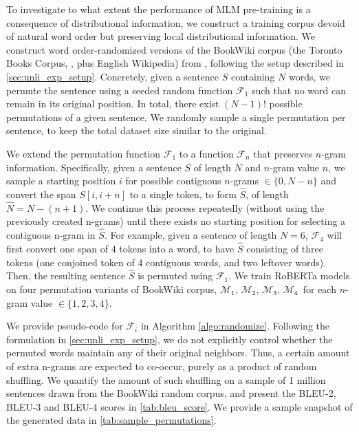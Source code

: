\documentclass[letterpaper, 12pt]{report}
\newcommand{\RI}{$\mathcal{M}_{\texttt{1}}$}
\newcommand{\RII}{$\mathcal{M}_{\texttt{2}}$}
\newcommand{\RIII}{$\mathcal{M}_{\texttt{3}}$}
\newcommand{\RIV}{$\mathcal{M}_{\texttt{4}}$}
\begin{document}
To investigate to what extent the performance of MLM pre-training is a consequence of distributional information, we construct a training corpus devoid of natural word order but preserving local distributional information. We construct word order-randomized versions of the BookWiki corpus (the Toronto Books Corpus, \citealt{zhu2015aligning}, plus English Wikipedia) from \citet{liu2019b}, following the setup described in \autoref{sec:unli_exp_setup}. %
Concretely, given a sentence $S$ containing $N$ words, we permute the sentence using a seeded random function $\mathcal{F}_1$ such that no word can remain in its original position. In total, there exist $(N-1)!$ possible permutations of a given sentence. We randomly sample a single permutation per sentence, to keep the total dataset size similar to the original.

We extend the permutation function $\mathcal{F}_1$ to a function $\mathcal{F}_n$ that preserves $n$-gram information. Specifically, given a sentence $S$ of length $N$ and $n$-gram value $n$, we sample a starting position $i$ for possible contiguous $n$-grams $\in \{0, N-n\}$ and convert the span $S[i,i+n]$ to a single token, to form $\hat{S}$, of length $\hat{N} = N - (n+1)$. We continue this process repeatedly (without using the previously created n-grams) until there exists no starting position for selecting a contiguous n-gram in $\hat{S}$. For example, given a sentence of length $N=6$, $\mathcal{F}_4$ will first convert one span of 4 tokens into a word, to have $\hat{S}$ consisting of three tokens (one conjoined token of 4 contiguous words, and two leftover words).
Then, the resulting sentence $\hat{S}$ is permuted using $\mathcal{F}_1$. We train RoBERTa models on four permutation variants of BookWiki corpus, \RI, \RII, \RIII, \RIV\ for each $n$-gram value $ \in {\{1,2,3,4\}}$.

We provide pseudo-code for $\mathcal{F}_i$ in Algorithm \autoref{algo:randomize}.
Following the formulation in \autoref{sec:unli_exp_setup}, we do not explicitly control whether the permuted words maintain any of their original neighbors. Thus, a certain amount of extra n-grams are expected to co-occur, purely as a product of random shuffling. We quantify the amount of such shuffling on a sample of 1 million sentences drawn from the BookWiki random corpus, and present the BLEU-2, BLEU-3 and BLEU-4 scores in \autoref{tab:bleu_score}. We provide a sample snapshot of the generated data in \autoref{tab:sample_permutations}.
\end{document}
